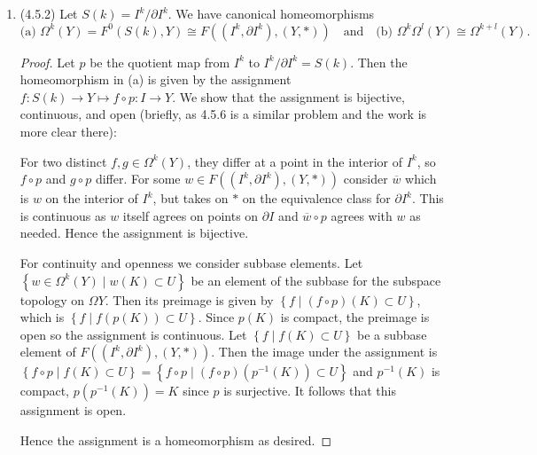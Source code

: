 \documentclass[11pt]{article}
\newcommand{\cbr}[1]{\left\{#1\right\}}
\begin{document}
\begin{enumerate}
    \item (4.5.2) Let $S(k) = I^k/\partial I^k$. We have canonical homeomorphisms \[\text{(a) } \Omega^k(Y) = F^0(S(k),Y) \cong F((I^k,\partial I^k),(Y,\ast)) \quad\text{and}\quad \text{(b) }\Omega^k\Omega^l(Y)\cong\Omega^{k+l}(Y).\] \begin{proof}
      Let $p$ be the quotient map from $I^k$ to $I^k/\partial I^k = S(k)$. Then the homeomorphism in (a) is given by the assignment $f\colon S(k)\to Y\mapsto f\circ p\colon I\to Y$. We show that the assignment is bijective, continuous, and open (briefly, as 4.5.6 is a similar problem and the work is more clear there):

      For two distinct $f,g\in \Omega^k(Y)$, they differ at a point in the interior of $I^k$, so $f\circ p$ and $g\circ p$ differ. For some $w\in F((I^k,\partial I^k),(Y,\ast))$ consider $\overline{w}$ which is $w$ on the interior of $I^k$, but takes on $\ast$ on the equivalence class for $\partial I^k$. This is continuous as $w$ itself agrees on points on $\partial I$ and $\overline{w}\circ p$ agrees with $w$ as needed. Hence the assignment is bijective.

      For continuity and openness we consider subbase elements. Let $\cbr{w\in \Omega^k(Y)\mid w(K)\subset U}$ be an element of the subbase for the subspace topology on $\Omega Y$. Then its preimage is given by $\cbr{f\mid (f\circ p)(K)\subset U}$, which is $\cbr{f\mid f(p(K))\subset U}$. Since $p(K)$ is compact, the preimage is open so the assignment is continuous. Let $\cbr{f\mid f(K)\subset U}$ be a subbase element of $F((I^k,\partial I^k),(Y,\ast))$. Then the image under the assignment is $\cbr{f\circ p\mid f(K)\subset U} = \cbr{f\circ p\mid (f\circ p)(p^{-1}(K))\subset U}$ and $p^{-1}(K)$ is compact, $p(p^{-1}(K)) = K$ since $p$ is surjective. It follows that this assignment is open.

      Hence the assignment is a homeomorphism as desired.


\end{proof}
\end{enumerate}
\end{document}
